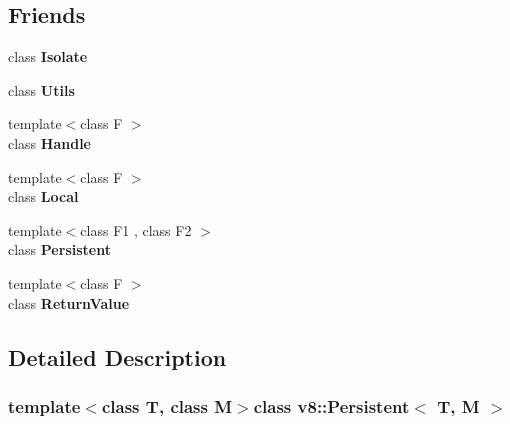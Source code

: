 \subsection*{Friends}
\begin{DoxyCompactItemize}
\item 
\hypertarget{classv8_1_1Persistent_aba4f0964bdacf2bbf62cf876e5d28d0a}{}class {\bfseries Isolate}\label{classv8_1_1Persistent_aba4f0964bdacf2bbf62cf876e5d28d0a}

\item 
\hypertarget{classv8_1_1Persistent_abc0f7da619e9e72510dc07ed7b5ff6d8}{}class {\bfseries Utils}\label{classv8_1_1Persistent_abc0f7da619e9e72510dc07ed7b5ff6d8}

\item 
\hypertarget{classv8_1_1Persistent_a67ca1a2d91273eaf85fb3d23ba8ce984}{}{\footnotesize template$<$class F $>$ }\\class {\bfseries Handle}\label{classv8_1_1Persistent_a67ca1a2d91273eaf85fb3d23ba8ce984}

\item 
\hypertarget{classv8_1_1Persistent_afb872edb4aac7ba55f0da004113aa2b0}{}{\footnotesize template$<$class F $>$ }\\class {\bfseries Local}\label{classv8_1_1Persistent_afb872edb4aac7ba55f0da004113aa2b0}

\item 
\hypertarget{classv8_1_1Persistent_ad845ec8872174be0a9ca9a3dd1898d30}{}{\footnotesize template$<$class F1 , class F2 $>$ }\\class {\bfseries Persistent}\label{classv8_1_1Persistent_ad845ec8872174be0a9ca9a3dd1898d30}

\item 
\hypertarget{classv8_1_1Persistent_a53f604d3d6f2dc0647df33c9979f116a}{}{\footnotesize template$<$class F $>$ }\\class {\bfseries Return\+Value}\label{classv8_1_1Persistent_a53f604d3d6f2dc0647df33c9979f116a}

\end{DoxyCompactItemize}


\subsection{Detailed Description}
\subsubsection*{template$<$class T, class M$>$class v8\+::\+Persistent$<$ T, M $>$}

